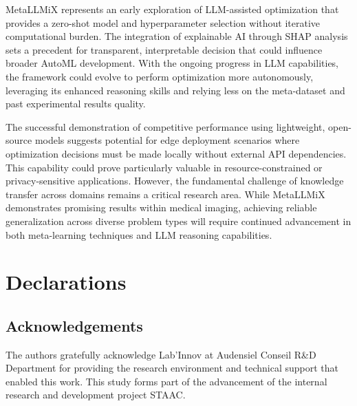 \documentclass{article}
\begin{document}
MetaLLMiX represents an early exploration of LLM-assisted optimization that provides a zero-shot model and hyperparameter selection without iterative computational burden. The integration of explainable AI through SHAP analysis sets a precedent for transparent, interpretable decision that could influence broader AutoML development. With the ongoing progress in LLM capabilities, the framework could evolve to perform optimization more autonomously, leveraging its enhanced reasoning skills and relying less on the meta-dataset and past experimental results quality.

The successful demonstration of competitive performance using lightweight, open-source models suggests potential for edge deployment    scenarios where optimization decisions must be made locally without external API dependencies. This capability could prove particularly valuable in resource-constrained or privacy-sensitive applications. However, the fundamental challenge of knowledge transfer across domains remains a critical research area. While MetaLLMiX demonstrates promising results within medical imaging, achieving reliable generalization across diverse problem types will require continued advancement in both meta-learning techniques and LLM reasoning capabilities.

\section*{Declarations}
\subsection*{Acknowledgements}
The authors gratefully acknowledge Lab’Innov at Audensiel Conseil R\&D Department for providing the research environment and technical support that enabled this work. This study forms part of the advancement of the internal research and development project STAAC.



  
  
\end{document}
